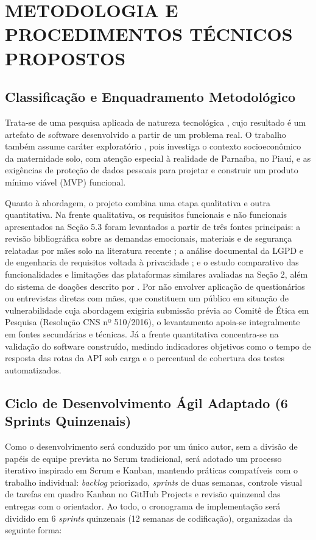 \section{METODOLOGIA E PROCEDIMENTOS TÉCNICOS PROPOSTOS}

\subsection{Classificação e Enquadramento Metodológico}
Trata-se de uma pesquisa aplicada de natureza tecnológica \cite{wazlawick2014}, cujo resultado é um artefato de software desenvolvido a partir de um problema real. O trabalho também assume caráter exploratório \cite{gil2017}, pois investiga o contexto socioeconômico da maternidade solo, com atenção especial à realidade de Parnaíba, no Piauí, e as exigências de proteção de dados pessoais para projetar e construir um produto mínimo viável (MVP) funcional.

Quanto à abordagem, o projeto combina uma etapa qualitativa e outra quantitativa. Na frente qualitativa, os requisitos funcionais e não funcionais apresentados na Seção 5.3 foram levantados a partir de três fontes principais: a revisão bibliográfica sobre as demandas emocionais, materiais e de segurança relatadas por mães solo na literatura recente \cite{brito2022, araujo2025, sousa2025}; a análise documental da LGPD e de engenharia de requisitos voltada à privacidade \cite{brasil2018, moura2024}; e o estudo comparativo das funcionalidades e limitações das plataformas similares avaliadas na Seção 2, além do sistema de doações descrito por \textcite{santos2026}. Por não envolver aplicação de questionários ou entrevistas diretas com mães, que constituem um público em situação de vulnerabilidade cuja abordagem exigiria submissão prévia ao Comitê de Ética em Pesquisa (Resolução CNS nº 510/2016), o levantamento apoia-se integralmente em fontes secundárias e técnicas. Já a frente quantitativa concentra-se na validação do software construído, medindo indicadores objetivos como o tempo de resposta das rotas da API sob carga e o percentual de cobertura dos testes automatizados.

\subsection{Ciclo de Desenvolvimento Ágil Adaptado (6 Sprints Quinzenais)}
Como o desenvolvimento será conduzido por um único autor, sem a divisão de papéis de equipe prevista no Scrum tradicional, será adotado um processo iterativo inspirado em Scrum e Kanban, mantendo práticas compatíveis com o trabalho individual: \textit{backlog} priorizado, \textit{sprints} de duas semanas, controle visual de tarefas em quadro Kanban no GitHub Projects e revisão quinzenal das entregas com o orientador. Ao todo, o cronograma de implementação será dividido em 6 \textit{sprints} quinzenais (12 semanas de codificação), organizadas da seguinte forma:


